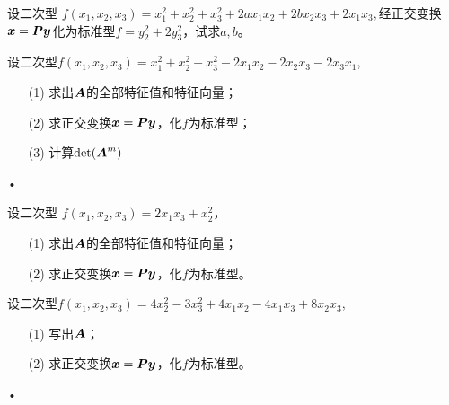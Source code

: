 \begin{frame}
  
  \begin{li}[2008-2009第一学期]
    设二次型
    $
    f(x_1,x_2,x_3)=x_1^2+x_2^2+x_3^2+2ax_1x_2+2bx_2x_3+2x_1x_3,
    $经正交变换${\boldsymbol{x}}=\boldsymbol{P}{\boldsymbol{y}}$化为标准型$f=y_2^2+2y_3^2$，试求$a,b$。      
  \end{li}
\end{frame}

\begin{frame}
  \begin{li}[2008-2009第一学期]
    设二次型$f(x_1,x_2,x_3)=x_1^2+x_2^2+x_3^2-2x_1x_2-2x_2x_3-2x_3x_1$,      
    \begin{itemize}
    \item[(1)] 求出$\boldsymbol{A}$的全部特征值和特征向量；
    \item[(2)] 求正交变换${\boldsymbol{x}}=\boldsymbol{P}{\boldsymbol{y}}$，化$f$为标准型；
    \item[(3)] 计算$\mathrm{det}(\boldsymbol{A}^m)$
    \end{itemize}•
  \end{li}
  
\end{frame}


\begin{frame}
  
  \begin{li}[2009-2010第二学期]
    设二次型
    $
    f(x_1,x_2,x_3)=2x_1x_3+x_2^2
    $，\begin{itemize}
    \item[(1)] 求出$\boldsymbol{A}$的全部特征值和特征向量；
    \item[(2)] 求正交变换${\boldsymbol{x}}=\boldsymbol{P}{\boldsymbol{y}}$，化$f$为标准型。
    \end{itemize}      
  \end{li}
\end{frame}

\begin{frame}
  \begin{li}[2010-2011第一学期]
    设二次型$f(x_1,x_2,x_3)=4x_2^2-3x_3^2+4x_1x_2-4x_1x_3+8x_2x_3$,      
    \begin{itemize}
    \item[(1)] 写出$\boldsymbol{A}$；
    \item[(2)] 求正交变换${\boldsymbol{x}}=\boldsymbol{P}{\boldsymbol{y}}$，化$f$为标准型。
    \end{itemize}•
  \end{li}
  
\end{frame}


